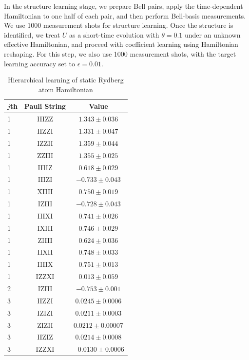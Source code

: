 \documentclass[twocolumn,superscriptaddress,aps,showpacs,amsmath,amstex,amssymb,citeautoscript,floatfix,pra,preprintnumbers]{revtex4-2}
\theoremstyle{plain}
\theoremstyle{plain}
\theoremstyle{plain}
\theoremstyle{plain}
\theoremstyle{plain}
\theoremstyle{plain}
\begin{document}
\begin{appendix}
In the structure learning stage, we prepare Bell pairs, apply the time-dependent Hamiltonian to one half of each pair, and then perform Bell-basis measurements. We use 1000 measurement shots for structure learning. Once the structure is identified, we treat $U$ as a short-time evolution with $\theta = 0.1$ under an unknown effective Hamiltonian, and proceed with coefficient learning using Hamiltonian reshaping. For this step, we also use 1000 measurement shots, with the target learning accuracy set to $\epsilon = 0.01$.




 





\begin{table}[htbp]
\caption{Hierarchical learning of static Rydberg atom Hamiltonian\label{table:rydberg}}
\vspace{5mm}
\begin{ruledtabular}
\begin{tabular}{lcc}
$j$th & Pauli String & Value \\
\hline
1 & IIIZZ & $1.343 \pm 0.036$ \\
1 & IIZZI & $1.331 \pm 0.047$ \\
1 & IZZII & $1.359 \pm 0.044$ \\
1 & ZZIII & $1.355 \pm 0.025$ \\
1 & IIIIZ & $0.618 \pm 0.029$ \\
1 & IIIZI & $-0.733 \pm 0.043$ \\
1 & XIIII & $0.750 \pm 0.019$ \\
1 & IZIII & $-0.728 \pm 0.043$ \\
1 & IIIXI & $0.741 \pm 0.026$ \\
1 & IXIII & $0.746 \pm 0.029$ \\
1 & ZIIII & $0.624 \pm 0.036$ \\
1 & IIXII & $0.748 \pm 0.033$ \\
1 & IIIIX & $0.751 \pm 0.013$ \\
1 & IZZXI & $0.013 \pm 0.059$ \\
\midrule
2 & IZIII & $-0.753 \pm 0.001$ \\
\midrule
3 & IIZZI & $0.0245 \pm 0.0006$ \\
3 & IZIZI & $0.0211 \pm 0.0003$ \\
3 & ZIZII & $0.0212 \pm 0.00007$ \\
3 & IIZIZ & $0.0214 \pm 0.0008$ \\
3 & IZZXI & $-0.0130 \pm 0.0006$ \\

\end{tabular}
\end{ruledtabular}
\end{table}
\end{appendix}
\end{document}
